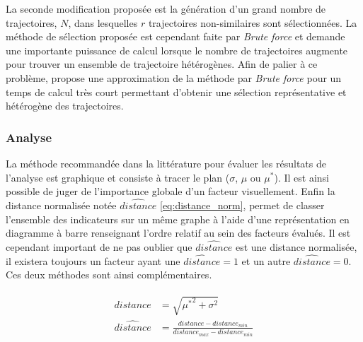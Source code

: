 La seconde modification proposée est la génération d’un grand nombre de trajectoires, $N$,
dans lesquelles $r$ trajectoires non-similaires sont sélectionnées.  La méthode de sélection
proposée est cependant faite par \emph{Brute force} et demande une importante puissance de
calcul lorsque le nombre de trajectoires augmente pour trouver un ensemble de trajectoire
hétérogènes.
Afin de palier à ce problème, \cite{Ruano2012103} propose une approximation de
la méthode par \emph{Brute force} pour un temps de calcul très court permettant d’obtenir
une sélection représentative et hétérogène des trajectoires.


\subsubsection{Analyse} %
\label{ssub:analyse}
La méthode recommandée dans la littérature pour évaluer les résultats de l’analyse
est graphique et consiste à tracer le plan ($\sigma$, $\mu$ ou $\mu^{*}$). Il est
ainsi possible de juger de l’importance globale d’un facteur visuellement.
Enfin la distance normalisée notée $\hat{distance}$ \eqref{eq:distance_norm}, permet
de classer l’ensemble des indicateurs sur un même graphe à l’aide d’une représentation
en diagramme à barre renseignant l’ordre relatif au sein des facteurs évalués.
Il est cependant important de ne pas oublier que $\hat{distance}$ est une distance
normalisée, il existera toujours un facteur ayant une $\hat{distance} = 1$ et un autre
$\hat{distance} = 0$. Ces deux méthodes sont ainsi complémentaires.

\begin{align}\label{eq:distance_norm}
    \begin{split}
        distance        &= \sqrt{{\mu^{*}}^2 + \sigma^{2}} \\
        \hat{distance}  &=  \frac{distance - distance_{min}}{distance_{max} - distance_{min}}
    \end{split}
\end{align}

